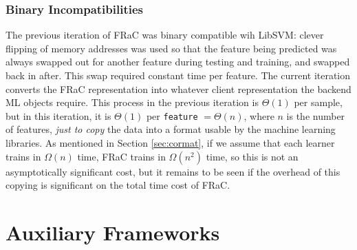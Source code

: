 \documentclass{article}
\begin{document}
\begin{multicols}{2}
\subsubsection{Binary Incompatibilities}
The previous iteration of FRaC was binary compatible wih LibSVM: clever flipping of memory addresses was used so that the feature being predicted was always swapped out for another feature during testing and training, and swapped back in after.  This swap required constant time per feature.  The current iteration converts the FRaC representation into whatever client representation the backend ML objects require.  This process in the previous iteration is $\Theta(1)$ per sample, but in this iteration, it is $\Theta(1)$ per \texttt{feature} $= \Theta(n)$, where $n$ is the number of features, \textit{just to copy} the data into a format usable by the machine learning libraries.  As mentioned in Section \ref{sec:cormat}, if we assume that each learner trains in $\Omega(n)$ time, FRaC trains in $\Omega(n^2)$ time, so this is not an asymptotically significant cost, but it remains to be seen if the overhead of this copying is significant on the total time cost of FRaC.

\end{multicols}
\pagebreak[2]

\section{Auxiliary Frameworks}

\label{sec:aux}
\end{document}
